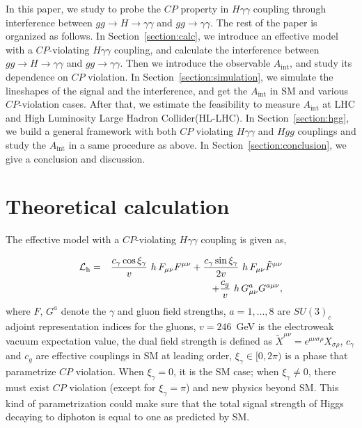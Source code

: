 \documentclass[twocolumn,
prd,amssymb,amsmath,preprintnumbers,
floatfix,aps,nofootinbib]{revtex4-1}
\newcommand{\bea}{\begin{eqnarray}}
\newcommand{\eea}{\end{eqnarray}}
\begin{document}
In this paper,
we study to probe the $CP$ property in $H\gamma\gamma$ coupling
through
interference between
$gg\to H \to \gamma\gamma$ and $gg\to \gamma\gamma$.
The rest of the paper is organized as follows. In Section~\ref{section:calc},
we introduce an effective model with a $CP$-violating $H\gamma\gamma$ coupling,
 and calculate the interference between $gg\to H \to\gamma\gamma$ and $gg\to \gamma\gamma$.
 Then we introduce the observable $A_{\text{int}}$, and study its dependence on $CP$ violation.
In Section~\ref{section:simulation}, we simulate the lineshapes of the signal and the interference,
 and get the $A_{\text{int}}$ in SM and various $CP$-violation cases.
 After that, we estimate the feasibility to measure $A_{\text{int}}$ at LHC and High Luminosity Large Hadron Collider(HL-LHC).
In Section~\ref{section:hgg}, we build a general framework with both $CP$
violating $H\gamma\gamma$ and $Hgg$ couplings and study the $A_{\text{int}}$ in a same procedure
as above.
In Section~\ref{section:conclusion}, we give a conclusion and discussion.

\section{Theoretical calculation\label{section:calc}}

The effective model with a $CP$-violating $H\gamma\gamma$ coupling is given as,

\bea
        \mathcal{L}_{\rm h} &=&
\frac{c_\gamma \cos\xi_\gamma}{v}~h\,F_{\mu\nu} F^{\mu\nu} + \frac{c_\gamma \sin\xi_\gamma}{2v}~h\,F_{\mu\nu}\tilde{F}^{\mu\nu} \nonumber \\
&&+ \frac{c_g}{v}~h\,G^a_{\mu\nu}G^{a\mu\nu},
\label{eqn:HEF}
\eea
where $F$, $G^a$ denote the $\gamma$ and gluon field strengths, $a = 1,...,8$ are $SU(3)_c$ adjoint representation indices for the gluons, $v = 246$~GeV is the electroweak vacuum expectation value, the dual field strength is defined as $\tilde{X}^{\mu\nu}=\epsilon^{\mu\nu\sigma\rho}X_{\sigma\rho}$, $c_\gamma$ and $c_g$ are effective couplings in SM at leading order, $\xi_\gamma\in[0,2\pi)$ is a phase that parametrize $CP$ violation.
When $\xi_\gamma=0$, it is the SM case; when $\xi_\gamma\ne0$, there must exist $CP$ violation
(except for $\xi_\gamma=\pi$) and new physics beyond SM.
This kind of parametrization could make sure that the total signal
strength of Higgs decaying to diphoton is equal to one as predicted by SM.
\end{document}
